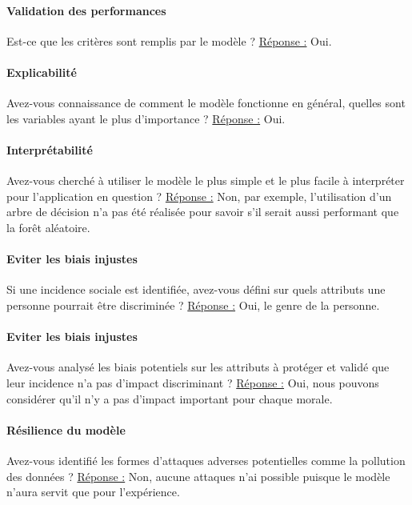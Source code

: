 \documentclass[10pt, french, a4paper]{report}
\begin{document}
\paragraph{Validation des performances} 
Est-ce que les critères sont remplis par le modèle ?
\newline
\underline{Réponse :} Oui.

\paragraph{Explicabilité} 
Avez-vous connaissance de comment le modèle fonctionne en général, quelles sont les variables ayant le plus d'importance ?
\newline
\underline{Réponse :} Oui.

\paragraph{Interprétabilité} 
Avez-vous cherché à utiliser le modèle le plus simple et le plus facile à interpréter pour l'application en question ?
\newline
\underline{Réponse :} Non, par exemple, l'utilisation d'un arbre de décision n'a pas été réalisée pour savoir s'il serait aussi performant que la forêt aléatoire.

\paragraph{Eviter les biais injustes} 
Si une incidence sociale est identifiée, avez-vous défini sur quels attributs une personne pourrait être discriminée ?
\newline
\underline{Réponse :} Oui, le genre de la personne.

\paragraph{Eviter les biais injustes} 
Avez-vous analysé les biais potentiels sur les attributs à protéger et validé que leur incidence n'a pas d'impact discriminant ?
\newline
\underline{Réponse :} Oui, nous pouvons considérer qu'il n'y a pas d'impact important pour chaque morale.

\paragraph{Résilience du modèle} 
Avez-vous identifié les formes d'attaques adverses potentielles comme la pollution des données ?
\newline
\underline{Réponse :} Non, aucune attaques n'ai possible puisque le modèle n'aura servit que pour l'expérience.
\end{document}
